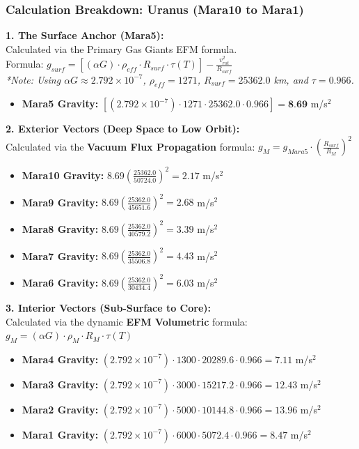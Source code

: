 \documentclass[11pt, a4paper]{article}
\begin{document}
\clearpage
\subsubsection{Calculation Breakdown: Uranus (Mara10 to Mara1)}

\noindent \textbf{1. The Surface Anchor (Mara5):} \\
Calculated via the Primary Gas Giants EFM formula. \\
Formula: $g_{surf} = \left[ (\alpha G) \cdot \rho_{eff} \cdot R_{surf} \cdot \tau(T) \right] - \frac{v_{rot}^2}{R_{surf}}$ \\
\textit{*Note: Using $\alpha G \approx 2.792 \times 10^{-7}$, $\rho_{eff} = 1271$, $R_{surf} = 25362.0$ km, and $\tau = 0.966$.}
\begin{itemize}
  \item \textbf{Mara5 Gravity:} $\left[ (2.792 \times 10^{-7}) \cdot 1271 \cdot 25362.0 \cdot 0.966 \right] = \textbf{8.69}$ m/s$^2$
\end{itemize}

\vspace{0.5em}
\noindent \textbf{2. Exterior Vectors (Deep Space to Low Orbit):} \\
Calculated via the \textbf{Vacuum Flux Propagation} formula: $g_M = g_{Mara5} \cdot \left( \frac{R_{surf}}{R_M} \right)^2$
\begin{itemize}
  \item \textbf{Mara10 Gravity:} $8.69 \left( \frac{25362.0}{50724.0} \right)^2 = 2.17$ m/s$^2$
  \item \textbf{Mara9 Gravity:} $8.69 \left( \frac{25362.0}{45651.6} \right)^2 = 2.68$ m/s$^2$
  \item \textbf{Mara8 Gravity:} $8.69 \left( \frac{25362.0}{40579.2} \right)^2 = 3.39$ m/s$^2$
  \item \textbf{Mara7 Gravity:} $8.69 \left( \frac{25362.0}{35506.8} \right)^2 = 4.43$ m/s$^2$
  \item \textbf{Mara6 Gravity:} $8.69 \left( \frac{25362.0}{30434.4} \right)^2 = 6.03$ m/s$^2$
\end{itemize}

\vspace{0.5em}
\noindent \textbf{3. Interior Vectors (Sub-Surface to Core):} \\
Calculated via the dynamic \textbf{EFM Volumetric} formula: $g_M = (\alpha G) \cdot \rho_{M} \cdot R_M \cdot \tau(T)$
\begin{itemize}
  \item \textbf{Mara4 Gravity:} $(2.792 \times 10^{-7}) \cdot 1300 \cdot 20289.6 \cdot 0.966 = 7.11$ m/s$^2$
  \item \textbf{Mara3 Gravity:} $(2.792 \times 10^{-7}) \cdot 3000 \cdot 15217.2 \cdot 0.966 = 12.43$ m/s$^2$
  \item \textbf{Mara2 Gravity:} $(2.792 \times 10^{-7}) \cdot 5000 \cdot 10144.8 \cdot 0.966 = 13.96$ m/s$^2$
  \item \textbf{Mara1 Gravity:} $(2.792 \times 10^{-7}) \cdot 6000 \cdot 5072.4 \cdot 0.966 = 8.47$ m/s$^2$
\end{itemize}
\end{document}
